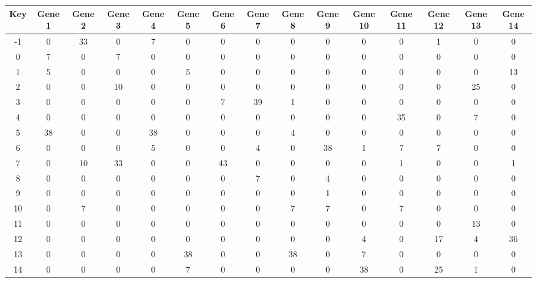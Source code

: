 \begin{tabular}{|c|c|c|c|c|c|c|c|c|c|c|c|c|c|c|}
\hline
Key & Gene 1 & Gene 2 & Gene 3 & Gene 4 & Gene 5 & Gene 6 & Gene 7 & Gene 8 & Gene 9 & Gene 10 & Gene 11 & Gene 12 & Gene 13 & Gene 14 \\
\hline
-1 & 0 & 33 & 0 & 7 & 0 & 0 & 0 & 0 & 0 & 0 & 0 & 1 & 0 & 0 \\
0 & 7 & 0 & 7 & 0 & 0 & 0 & 0 & 0 & 0 & 0 & 0 & 0 & 0 & 0 \\
1 & 5 & 0 & 0 & 0 & 5 & 0 & 0 & 0 & 0 & 0 & 0 & 0 & 0 & 13 \\
2 & 0 & 0 & 10 & 0 & 0 & 0 & 0 & 0 & 0 & 0 & 0 & 0 & 25 & 0 \\
3 & 0 & 0 & 0 & 0 & 0 & 7 & 39 & 1 & 0 & 0 & 0 & 0 & 0 & 0 \\
4 & 0 & 0 & 0 & 0 & 0 & 0 & 0 & 0 & 0 & 0 & 35 & 0 & 7 & 0 \\
5 & 38 & 0 & 0 & 38 & 0 & 0 & 0 & 4 & 0 & 0 & 0 & 0 & 0 & 0 \\
6 & 0 & 0 & 0 & 5 & 0 & 0 & 4 & 0 & 38 & 1 & 7 & 7 & 0 & 0 \\
7 & 0 & 10 & 33 & 0 & 0 & 43 & 0 & 0 & 0 & 0 & 1 & 0 & 0 & 1 \\
8 & 0 & 0 & 0 & 0 & 0 & 0 & 7 & 0 & 4 & 0 & 0 & 0 & 0 & 0 \\
9 & 0 & 0 & 0 & 0 & 0 & 0 & 0 & 0 & 1 & 0 & 0 & 0 & 0 & 0 \\
10 & 0 & 7 & 0 & 0 & 0 & 0 & 0 & 7 & 7 & 0 & 7 & 0 & 0 & 0 \\
11 & 0 & 0 & 0 & 0 & 0 & 0 & 0 & 0 & 0 & 0 & 0 & 0 & 13 & 0 \\
12 & 0 & 0 & 0 & 0 & 0 & 0 & 0 & 0 & 0 & 4 & 0 & 17 & 4 & 36 \\
13 & 0 & 0 & 0 & 0 & 38 & 0 & 0 & 38 & 0 & 7 & 0 & 0 & 0 & 0 \\
14 & 0 & 0 & 0 & 0 & 7 & 0 & 0 & 0 & 0 & 38 & 0 & 25 & 1 & 0 \\
\hline
\end{tabular}